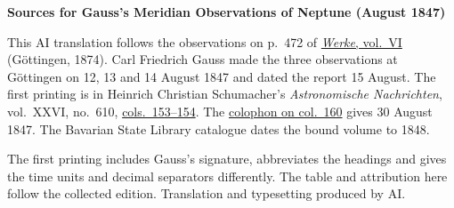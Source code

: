 \clearpage\thispagestyle{empty}
\begin{center}\textbf{Sources for Gauss’s Meridian Observations of Neptune (August 1847)}\end{center}
\noindent This AI translation follows the observations on p.~472 of \href{https://gdz.sub.uni-goettingen.de/id/PPN236007467}{\textit{Werke}, vol.~VI} (Göttingen, 1874). Carl Friedrich Gauss made the three observations at Göttingen on 12, 13 and 14 August 1847 and dated the report 15 August. The first printing is in Heinrich Christian Schumacher’s \textit{Astronomische Nachrichten}, vol.~XXVI, no.~610, \href{https://api.digitale-sammlungen.de/iiif/image/v2/bsb10049451_00085/full/1800,/0/default.jpg}{cols.~153--154}. The \href{https://api.digitale-sammlungen.de/iiif/image/v2/bsb10049451_00088/full/1800,/0/default.jpg}{colophon on col.~160} gives 30 August 1847. The Bavarian State Library catalogue dates the bound volume to 1848.
\par\smallskip\noindent The first printing includes Gauss’s signature, abbreviates the headings and gives the time units and decimal separators differently. The table and attribution here follow the collected edition. Translation and typesetting produced by AI.
\clearpage
